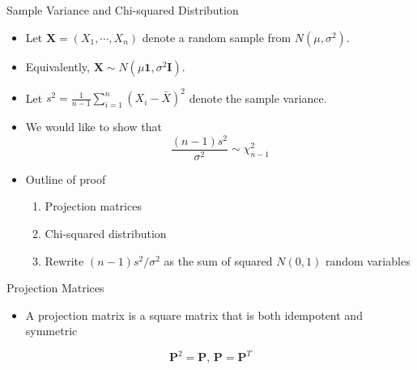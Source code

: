 \documentclass[
  ignorenonframetext,
]{beamer}
\providecommand{\tightlist}{%
  \setlength{\itemsep}{0pt}\setlength{\parskip}{0pt}}
\begin{document}
\begin{frame}{Sample Variance and Chi-squared Distribution}
\protect\hypertarget{sample-variance-and-chi-squared-distribution}{}
\begin{itemize}
\tightlist
\item
  Let \(\mathbf X=(X_1, \cdots, X_n)\) denote a random sample from
  \(N(\mu, \sigma^2)\).
\item
  Equivalently, \(\mathbf X \sim N(\mu \mathbf 1, \sigma^2 \mathbf I)\).
\item
  Let \(s^2=\frac{1}{n-1}\sum_{i=1}^n (X_i-\bar X)^2\) denote the sample
  variance.
\item
  We would like to show that
  \[\frac{(n-1)s^2}{\sigma^2}\sim \chi_{n-1}^2\]
\item
  Outline of proof

  \begin{enumerate}
  \tightlist
  \item
    Projection matrices
  \item
    Chi-squared distribution
  \item
    Rewrite \((n-1)s^2/\sigma^2\) as the sum of squared \(N(0,1)\)
    random variables
  \end{enumerate}
\end{itemize}
\end{frame}

\begin{frame}{Projection Matrices}
\protect\hypertarget{projection-matrices}{}
\begin{itemize}
\tightlist
\item
  A projection matrix is a square matrix that is both idempotent and
  symmetric
\end{itemize}

\[\mathbf{P}^2 = \mathbf{P} \mbox{, }\mathbf{P}=\mathbf{P}^T \]
\end{frame}
\end{document}
